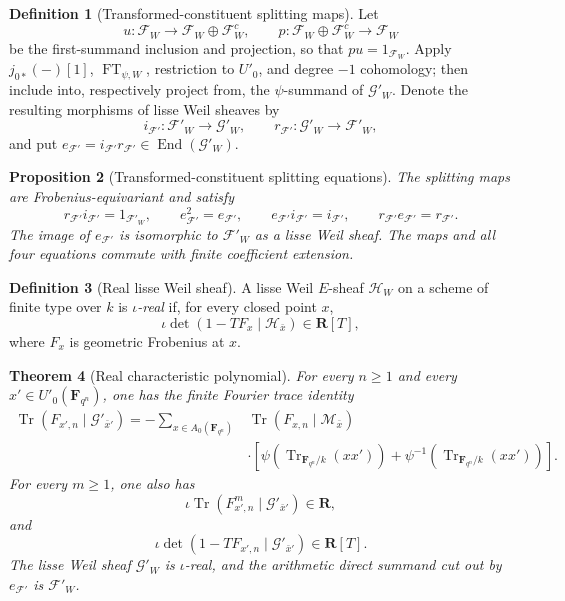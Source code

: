 \documentclass[10pt]{article}
\newtheorem{theorem}{Theorem}[section]
\newtheorem{proposition}[theorem]{Proposition}
\theoremstyle{definition}
\newtheorem{definition}[theorem]{Definition}
\newcommand{\Tr}{\operatorname{Tr}}
\newcommand{\FT}{\operatorname{FT}}
\begin{document}
\begin{definition}[Transformed-constituent splitting maps]
Let
\[
 u:\mathcal F_W\longrightarrow\mathcal F_W\oplus\mathcal F_W^c,
 \qquad
 p:\mathcal F_W\oplus\mathcal F_W^c\longrightarrow\mathcal F_W
\]
be the first-summand inclusion and projection, so that \(pu=1_{\mathcal
F_W}\).  Apply \(j_{0*}(-)[1]\), \(\FT_{\psi,W}\), restriction to
\(U'_0\), and degree \(-1\) cohomology; then include into, respectively
project from, the \(\psi\)-summand of \(\mathcal G'_W\).  Denote the
resulting morphisms of lisse Weil sheaves by
\[
 i_{\mathcal F'}:\mathcal F'_W\longrightarrow\mathcal G'_W,
 \qquad
 r_{\mathcal F'}:\mathcal G'_W\longrightarrow\mathcal F'_W,
\]
and put \(e_{\mathcal F'}=i_{\mathcal F'}r_{\mathcal F'}\in
\operatorname{End}(\mathcal G'_W)\).
\end{definition}

\begin{proposition}[Transformed-constituent splitting equations]
The splitting maps are Frobenius-equivariant and satisfy
\[
 r_{\mathcal F'}i_{\mathcal F'}=1_{\mathcal F'_W},\qquad
 e_{\mathcal F'}^2=e_{\mathcal F'},\qquad
 e_{\mathcal F'}i_{\mathcal F'}=i_{\mathcal F'},\qquad
 r_{\mathcal F'}e_{\mathcal F'}=r_{\mathcal F'}.
\]
The image of \(e_{\mathcal F'}\) is isomorphic to \(\mathcal F'_W\) as a
lisse Weil sheaf.  The maps and all four equations commute with finite
coefficient extension.
\end{proposition}

\begin{definition}[Real lisse Weil sheaf]
A lisse Weil \(E\)-sheaf \(\mathcal H_W\) on a scheme of finite type over
\(k\) is \emph{\(\iota\)-real} if, for every closed point \(x\),
\[
 \iota\det\!\left(1-TF_x\mid\mathcal H_{\bar x}\right)\in\mathbf R[T],
\]
where \(F_x\) is geometric Frobenius at \(x\).
\end{definition}

\begin{theorem}[Real characteristic polynomial]
For every \(n\ge1\) and every
\(x'\in U'_0(\mathbf F_{q^n})\), one has the finite Fourier trace identity
\[
 \begin{aligned}
 \Tr(F_{x',n}\mid\mathcal G'_{\bar x'})
 =-\sum_{x\in A_0(\mathbf F_{q^n})}
 &\Tr(F_{x,n}\mid\mathcal M_{\bar x})\\
 &\cdot\left[
 \psi(\Tr_{\mathbf F_{q^n}/k}(xx'))+
 \psi^{-1}(\Tr_{\mathbf F_{q^n}/k}(xx'))
 \right].
 \end{aligned}
\]
For every \(m\geq1\), one also has
\[
 \iota\Tr\!\left(F_{x',n}^{m}\mid\mathcal G'_{\bar x'}\right)
 \in\mathbf R,
\]
and
\[
 \iota\det(1-TF_{x',n}\mid\mathcal G'_{\bar x'})\in\mathbf R[T].
\]
The lisse Weil sheaf \(\mathcal G'_W\) is \(\iota\)-real, and the arithmetic
direct summand cut out by \(e_{\mathcal F'}\) is \(\mathcal F'_W\).
\end{theorem}
\end{document}
